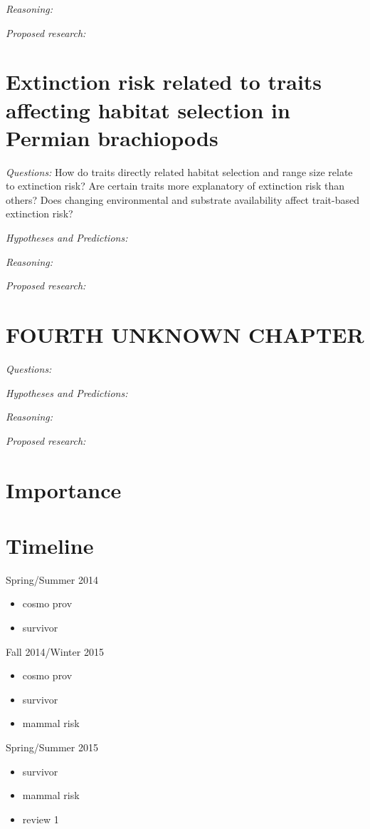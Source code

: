 \documentclass[12pt,letterpaper]{article}
\begin{document}
\textit{Reasoning:}

\textit{Proposed research:}


\section{Extinction risk related to traits affecting habitat selection in Permian brachiopods}

\textit{Questions:} How do traits directly related habitat selection and range size relate to extinction risk? Are certain traits more explanatory of extinction risk than others? Does changing environmental and substrate availability affect trait-based extinction risk?

\textit{Hypotheses and Predictions:}

\textit{Reasoning:}

\textit{Proposed research:}


\section{FOURTH UNKNOWN CHAPTER}

\textit{Questions:}

\textit{Hypotheses and Predictions:}

\textit{Reasoning:}

\textit{Proposed research:}


\section{Importance}

\clearpage
\section{Timeline}

Spring/Summer 2014
\begin{itemize}
  \item cosmo prov
  \item survivor
\end{itemize}

Fall 2014/Winter 2015
\begin{itemize}
  \item cosmo prov
  \item survivor
  \item mammal risk
\end{itemize}

Spring/Summer 2015
\begin{itemize}
  \item survivor
  \item mammal risk
  \item review 1
\end{itemize}
\end{document}
